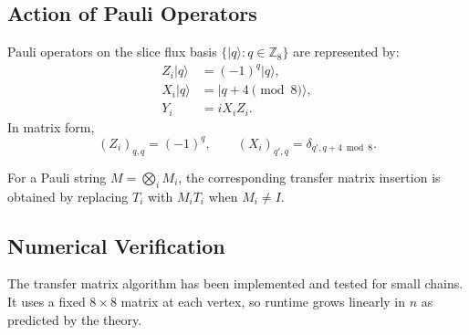 \subsection{Action of Pauli Operators}

Pauli operators on the slice flux basis $\{|q\rangle : q \in \mathbb{Z}_8\}$ are represented by:
\begin{align}
Z_i |q\rangle &= (-1)^q |q\rangle, \\
X_i |q\rangle &= |q + 4 \pmod{8}\rangle, \\
Y_i &= i X_i Z_i.
\end{align}
In matrix form,
\[
(Z_i)_{q,q} = (-1)^q, \qquad (X_i)_{q',q} = \delta_{q',q+4 \bmod 8}.
\]

For a Pauli string $M = \bigotimes_i M_i$, the corresponding transfer matrix insertion is obtained by replacing $T_i$ with $M_i T_i$ when $M_i \neq I$.

\subsection{Numerical Verification}

The transfer matrix algorithm has been implemented and tested for small chains. It uses a fixed $8 \times 8$ matrix at each vertex, so runtime grows linearly in $n$ as predicted by the theory.
